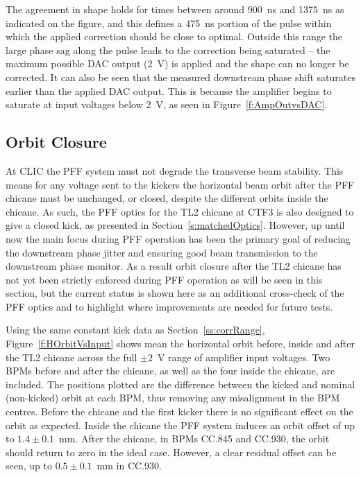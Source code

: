 The agreement in shape holds for times between around 900~ns and 1375~ns as indicated on the figure, and this defines a 475~ns portion of the pulse within which the applied correction should be close to optimal. Outside this range the large phase sag along the pulse leads 
to the correction being saturated -- the maximum possible DAC output 
(2~V) is applied and the shape can no longer be corrected. It can also
be seen that the measured downstream phase shift saturates earlier than
the applied DAC output. This is because the amplifier begins to 
saturate at input voltages below 2~V, as seen in Figure~\ref{f:AmpOutvsDAC}.

\subsection{Orbit Closure}
\label{ss:orbitClosure}

At CLIC the PFF system must not degrade the transverse beam stability. This means for any voltage sent to the kickers the horizontal beam orbit after the PFF chicane must be unchanged, or closed, despite the different orbits inside the chicane. As such, the PFF optics for the TL2 chicane at CTF3 is also designed to give a closed kick, as presented in Section~\ref{s:matchedOptics}. However, up until now the main focus during PFF operation has been the primary goal of reducing the downstream phase jitter and ensuring good beam transmission to the downstream phase monitor. As a result orbit closure after the TL2 chicane has not yet been strictly enforced during PFF operation as will be seen in this section, but the current status is shown here as an additional cross-check of the PFF optics and to highlight where improvements are needed for future tests.

Using the same constant kick data as Section~\ref{ss:corrRange}, Figure~\ref{f:HOrbitVsInput} shows mean the horizontal orbit before, inside and after the TL2 chicane across the full \(\pm2\)~V range of amplifier input voltages. Two BPMs before and after the chicane, as well as the four inside the chicane, are included. The positions plotted are the difference between the kicked and nominal (non-kicked) orbit at each BPM, thus removing any misalignment in the BPM centres. Before the chicane and the first kicker there is no significant effect on the orbit as expected. Inside the chicane the PFF system induces an orbit offset of up to \(1.4\pm0.1\)~mm. After the chicane, in BPMs CC.845 and CC.930, the orbit should return to zero in the ideal case. However, a clear residual offset can be seen, up to \(0.5\pm0.1\)~mm in CC.930.

